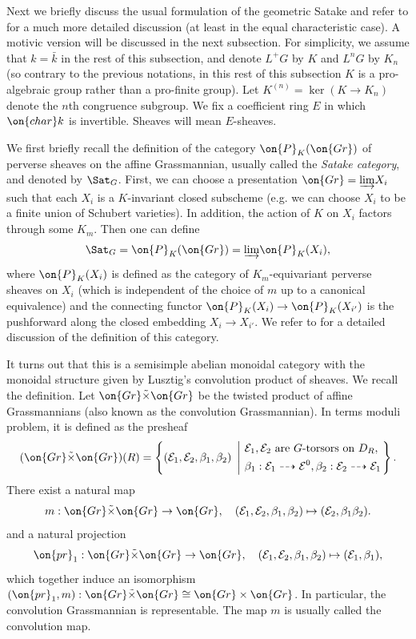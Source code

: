 \documentclass[11pt]{amsart}
\theoremstyle{definition}
\theoremstyle{definition}
\theoremstyle{definition}
\numberwithin{equation}{subsection}
\newcommand{\mE}{{\mathcal E}}
\newcommand{\Gr}{{\on{Gr}}}
\newcommand{\pr}{{\on{pr}}}
\begin{document}
Next we briefly discuss the usual formulation of the geometric Satake and refer to \cite{Zh2} for a much more detailed discussion (at least in the equal characteristic case). 
A motivic version will be discussed in the next subsection.
For simplicity, we assume that $k=\bar{k}$ in the rest of this subsection, and denote $L^+G$ by $K$ and $L^nG$ by $K_n$ (so contrary to the previous notations, in this rest of this subsection $K$ is a pro-algebraic group rather than a pro-finite group). Let $K^{(n)}=\ker(K\to K_n)$ denote the $n$th congruence subgroup. We fix a coefficient ring $E$ in which $\on{char} k$ is invertible. Sheaves will mean $E$-sheaves.

We first briefly recall the definition of the category $\on{P}_{K}(\Gr)$ of perverse sheaves on the affine Grassmannian, usually called the \emph{Satake category}, and denoted by $\Sat_G$. 
First, we can choose a presentation $\Gr=\underrightarrow\lim X_i$ such that each $X_i$ is a $K$-invariant closed subscheme (e.g. we can choose $X_i$ to be a finite union of Schubert varieties). In addition, the action of $K$ on $X_i$ factors through some $K_m$.
Then one can define 
\[\Sat_G=\on{P}_{K}(\Gr)=\underrightarrow\lim\on{P}_{K}(X_i),\]
where $\on{P}_{K}(X_i)$ is defined as the category of $K_m$-equivariant perverse sheaves on $X_i$ (which is independent of the choice of $m$ up to a canonical equivalence) and the connecting functor $\on{P}_{K}(X_i)\to \on{P}_{K}(X_{i'})$ is the pushforward along the closed embedding $X_i\to X_{i'}$. We refer to \cite[\S A.1.17]{Zh2} for a detailed discussion of the definition of this category.

It turns out that this is a semisimple abelian monoidal category with the monoidal structure given by Lusztig's convolution product of sheaves. We recall the definition. Let $\Gr\tilde\times \Gr$ be the twisted product of affine Grassmannians (also known as the convolution Grassmannian). In terms moduli problem, it is defined as the presheaf
\begin{equation*}\label{I:conv}
(\Gr\tilde\times\Gr)(R)=\left\{(\mE_1,\mE_2,\beta_1,\beta_2)\ \left|\ \begin{split}&\mE_1,\mE_2 \mbox{ are }  G\mbox{-torsors on } D_R, \\
&  \beta_1:\mE_1\dashrightarrow \mE^0, \beta_2:\mE_2\dashrightarrow  \mE_1\end{split}\right.\right\}.
\end{equation*}
There exist a natural map
\begin{equation}\label{conv m0}
m:\Gr\tilde\times\Gr\to \Gr,\quad (\mE_1,\mE_2,\beta_1,\beta_2)\mapsto (\mE_2, \beta_1\beta_2).
\end{equation}
and a natural projection
$$\pr_1:\Gr\tilde\times\Gr\to \Gr, \quad (\mE_1,\mE_2,\beta_1,\beta_2)\mapsto (\mE_1,\beta_1),$$
which together induce an isomorphism
$(\pr_1,m):\Gr\tilde\times\Gr\cong \Gr\times \Gr$.
In particular, the convolution Grassmannian is representable.  The map $m$ is usually called the convolution map. 
\end{document}
